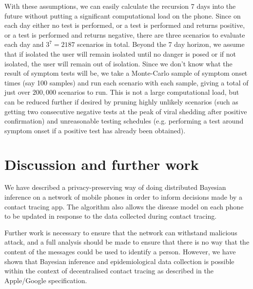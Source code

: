 \documentclass{article}
\begin{document}
With these assumptions, we can easily calculate the recursion 7 days into the future without putting a significant computational load on the phone. Since on each day either no test is performed, or a test is performed and returns positive, or a test is performed and returns negative, there are three scenarios to evaluate each day and $3^7 = 2187$ scenarios in total. Beyond the 7 day horizon, we assume that if isolated the user will remain isolated until no danger is posed or if not isolated, the user will remain out of isolation. Since we don't know what the result of symptom tests will be, we take a Monte-Carlo sample of symptom onset times (say 100 samples) and run each scenario with each sample, giving a total of just over $200,000$ scenarios to run. This is not a large computational load, but can be reduced further if desired by pruning highly unlikely scenarios (such as getting two consecutive negative tests at the peak of viral shedding after positive confirmation) and unreasonable testing schedules (e.g. performing a test around symptom onset if a positive test has already been obtained).

\section{Discussion and further work}

We have described a privacy-preserving way of doing distributed Bayesian inference on a network of mobile phones in order to inform decisions made by a contact tracing app. The algorithm also allows the disease model on each phone to be updated in response to the data collected during contact tracing.

Further work is necessary to ensure that the network can withstand malicious attack, and a full analysis should be made to ensure that there is no way that the content of the messages could be used to identify a person. However, we have shown that Bayesian inference and epidemiological data collection is possible within the context of decentralised contact tracing as described in the Apple/Google specification\cite{applegoogle}.


%

%
%
% 
%

\end{document}
